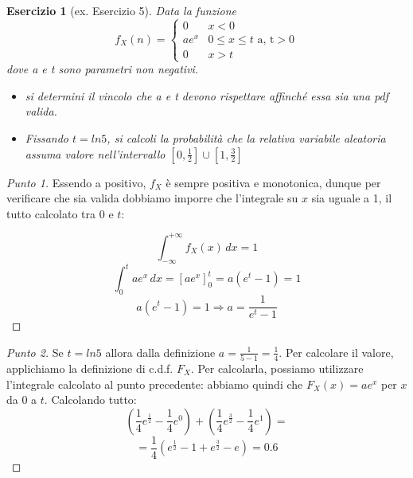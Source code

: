 \documentclass[12pt]{article}
\newtheorem{theorem}{Esercizio}
\renewcommand\qedsymbol{$\square$}
\begin{document}
\begin{theorem}[ex. Esercizio 5]
Data la funzione
$$
f_X(n) = \begin{cases} 0 & x < 0 \\ a e^x & 0 \le x \le t \mbox{   a, t} > 0 \\ 0 & x > t \end{cases}
$$
dove a e t sono parametri non negativi.
\begin{itemize}
    \item si determini il vincolo che a e t devono rispettare affinché essa sia una pdf valida.
    \item Fissando $t = ln 5$, si calcoli la probabilità che la relativa variabile aleatoria assuma valore nell’intervallo $[0, \frac{1}{2}] \cup [1, \frac{3}{2}]$  
\end{itemize}
\end{theorem}

\renewcommand\qedsymbol{$\square$}

\begin{proof}[Punto 1]
Essendo a positivo, $f_X$ è sempre positiva e monotonica, dunque per verificare che sia valida dobbiamo imporre che l’integrale su $x$ sia uguale a 1, il tutto calcolato tra $0$ e $t$:

$$
\int_{-\infty}^{+\infty} f_X(x) \,dx = 1
$$
$$
\int_{0}^{t} a e^x \,dx = [a e^x]^t_0 = a(e^t - 1) = 1
$$
$$
a(e^t - 1) = 1 \Longrightarrow a = \frac{1}{e^t - 1}
$$

\end{proof}

\renewcommand\qedsymbol{$\blacksquare$}

\begin{proof}[Punto 2]
Se $t = ln 5$ allora dalla definizione $a = \frac{1}{5-1} = \frac{1}{4}$. Per calcolare il valore, applichiamo la definizione di c.d.f. $F_X$. Per calcolarla, possiamo utilizzare l'integrale calcolato al punto precedente: abbiamo quindi che $F_X(x) = a e^x$ per $x$ da $0$ a $t$. Calcolando tutto:
$$
(\frac{1}{4} e^{\frac{1}{2}} - \frac{1}{4} e^{0}) + (\frac{1}{4} e^{\frac{3}{2}} - \frac{1}{4} e^{1}) = 
$$
$$
= \frac{1}{4} (e^{\frac{1}{2}} - 1 + e^{\frac{3}{2}} - e) = 0.6
$$
\end{proof}
\end{document}
